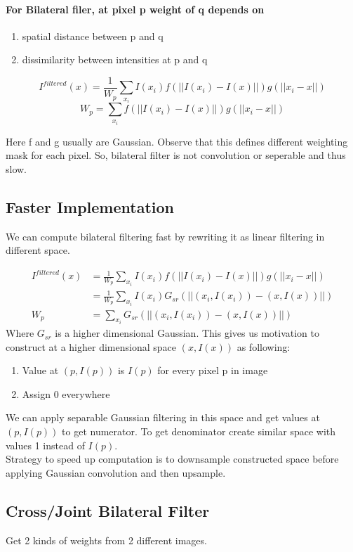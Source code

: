 \documentclass[a4paper,11pt]{article}
\begin{document}
\paragraph{\textnormal{For Bilateral filer, at pixel p weight of q depends on}}
\begin{enumerate}
\item spatial distance between p and q
\item dissimilarity between intensities at p and q
\end{enumerate} 

$$I^{filtered}(x) = \frac{1}{W_p}\sum_{x_i} I(x_i)f(||I(x_i)-I(x)||)g(||x_i-x||)$$
$$W_p = \sum_{x_i}f(||I(x_i)-I(x)||)g(||x_i-x||)$$

Here f and g usually are Gaussian. Observe that this defines different weighting mask for each pixel. So, bilateral filter is not convolution or seperable and thus slow.

\subsection{Faster Implementation}
We can compute bilateral filtering fast by rewriting it as linear filtering in different space.

\begin{align*}
I^{filtered}(x) &= \frac{1}{W_p}\sum_{x_i} I(x_i)f(||I(x_i)-I(x)||)g(||x_i-x||)\\
 &= \frac{1}{W_p}\sum_{x_i} I(x_i)G_{sr}(||(x_i,I(x_i))-(x,I(x))||)\\
W_p &= \sum_{x_i}G_{sr}(||(x_i,I(x_i))-(x,I(x))||)
\end{align*}
Where $G_{sr}$ is a higher dimensional Gaussian. This gives us motivation to construct at a higher dimensional space $(x,I(x))$ as following:
\begin{enumerate}
\item Value at $(p,I(p))$ is $I(p)$ for every pixel p in image
\item Assign 0 everywhere
\end{enumerate} 
We can apply separable Gaussian filtering in this space and get values at $(p,I(p))$ to get numerator. To get denominator create similar space with values 1 instead of $I(p)$.
\medskip
\\Strategy to speed up computation is to downsample constructed space before applying Gaussian convolution and then upsample. 

\subsection{Cross/Joint Bilateral Filter}
Get 2 kinds of weights from 2 different images.
\end{document}
